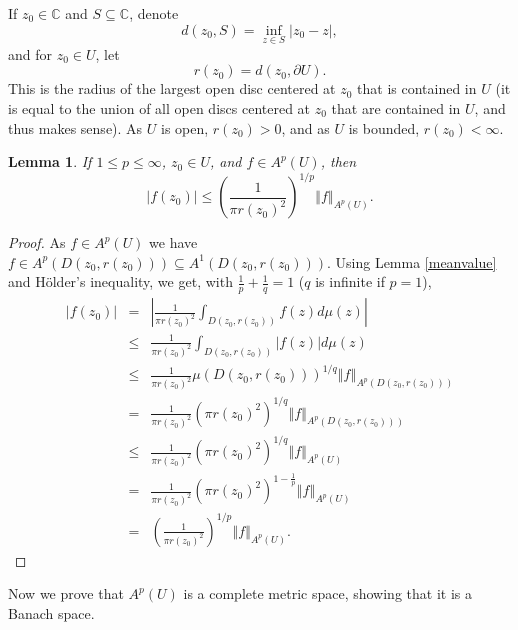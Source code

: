 \documentclass{article}
\newcommand{\norm}[1]{\left\Vert #1 \right\Vert}
\newtheorem{lemma}[theorem]{Lemma}
\begin{document}
If $z_0 \in \mathbb{C}$ and $S \subseteq \mathbb{C}$, denote
\[
d(z_0,S)=\inf_{z \in S} |z_0-z|,
\]
and for $z_0 \in U$, let
\[
r(z_0)=d(z_0,\partial U).
\]
This is the radius of the largest open disc centered at $z_0$ that is contained in $U$ (it is equal to the union of all open discs centered
at $z_0$ that are contained in $U$, and thus makes sense). As $U$ is open, $r(z_0)>0$, and as $U$ is bounded, $r(z_0)<\infty$.

\begin{lemma}
If $1 \leq p\leq \infty$,
$z_0 \in U$, and $f \in A^p(U)$, then
\[
|f(z_0)| \leq \left(\frac{1}{\pi r(z_0)^2}\right)^{1/p} \norm{f}_{A^p(U)}.
\]
\label{discinequality}
\end{lemma}
\begin{proof}
As $f \in A^p(U)$ we have $f \in A^p(D(z_0,r(z_0))) \subseteq A^1(D(z_0,r(z_0)))$.
Using Lemma \ref{meanvalue} and H\"older's inequality, we get, with $\frac{1}{p}+\frac{1}{q}=1$ ($q$ is infinite if $p=1$),
\begin{eqnarray*}
|f(z_0)|&=&\left| \frac{1}{\pi r(z_0)^2} \int_{D(z_0,r(z_0))} f(z) d\mu(z) \right|\\
&\leq& \frac{1}{\pi r(z_0)^2} \int_{D(z_0,r(z_0))} |f(z)| d\mu(z)\\
&\leq& \frac{1}{\pi r(z_0)^2} \mu(D(z_0,r(z_0)))^{1/q} \norm{f}_{A^p(D(z_0,r(z_0)))}\\
&=&\frac{1}{\pi r(z_0)^2} (\pi r(z_0)^2)^{1/q} \norm{f}_{A^p(D(z_0,r(z_0)))}\\
&\leq&\frac{1}{\pi r(z_0)^2} (\pi r(z_0)^2)^{1/q} \norm{f}_{A^p(U)}\\
&=&\frac{1}{\pi r(z_0)^2} (\pi r(z_0)^2)^{1-\frac{1}{p}} \norm{f}_{A^p(U)}\\
&=&\left(\frac{1}{\pi r(z_0)^2}\right)^{1/p} \norm{f}_{A^p(U)}.
\end{eqnarray*}
\end{proof}

Now we prove that $A^p(U)$ is a complete metric space, showing that it is a Banach space.
\end{document}
